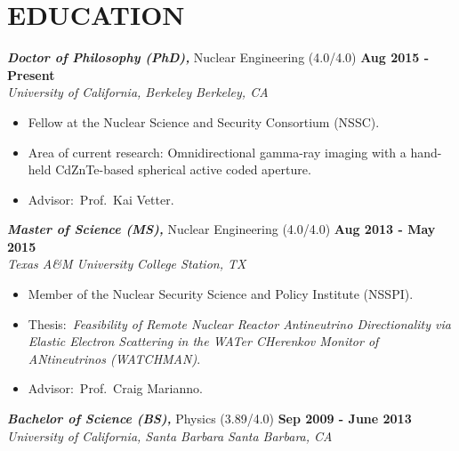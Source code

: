 \section{\small{EDUCATION}}

{\sl\bf Doctor of Philosophy (PhD),} Nuclear Engineering (4.0/4.0) \hfill {\bf Aug 2015 - Present}\\
{\sl University of California, Berkeley} \hfill {\sl Berkeley, CA}
\vspace{2.5pt}
\begin{itemize}[leftmargin=4ex] \itemsep -2pt %
\item Fellow at the Nuclear Science and Security Consortium (NSSC).
\item Area of current research: Omnidirectional gamma-ray imaging with a hand-held CdZnTe-based spherical active coded aperture.
\item Advisor:~Prof.~Kai Vetter.
\end{itemize}

{\sl\bf Master of Science (MS),} Nuclear Engineering (4.0/4.0) \hfill {\bf Aug 2013 - May 2015}\\
{\sl Texas A\&M University} \hfill {\sl College Station, TX}
\vspace{2.5pt}
\begin{itemize}[leftmargin=4ex] \itemsep -2pt %
\item Member of the Nuclear Security Science and Policy Institute (NSSPI).
\item Thesis:~\emph{Feasibility of Remote Nuclear Reactor Antineutrino Directionality via Elastic Electron Scattering in the WATer CHerenkov Monitor of ANtineutrinos (WATCHMAN)}.
\item Advisor:~Prof.~Craig Marianno.
\end{itemize}

{\sl\bf Bachelor of Science (BS),} Physics (3.89/4.0) \hfill {\bf Sep 2009 - June 2013} \\
{\sl University of California, Santa Barbara} \hfill {\sl Santa Barbara, CA}
\vspace{2pt}
